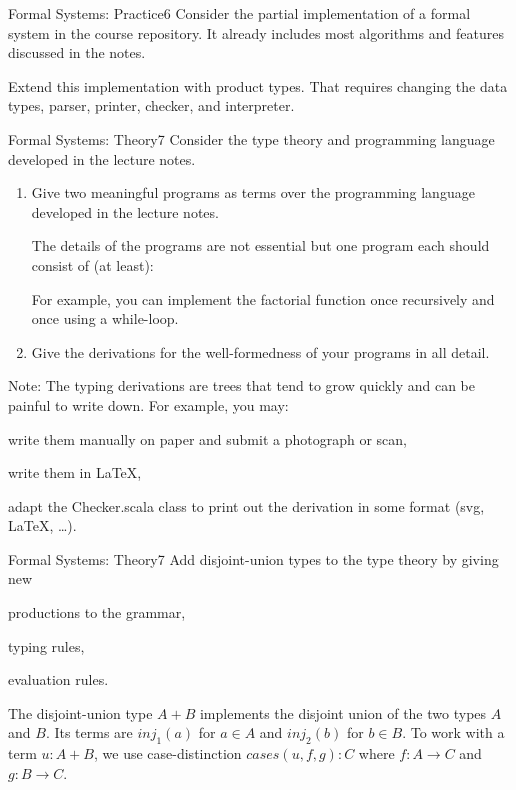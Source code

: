 \documentclass[a4paper]{article}
\begin{document}
\header

\begin{problem}{Formal Systems: Practice}{6}
Consider the partial implementation of a formal system in the course repository.
It already includes most algorithms and features discussed in the notes.

Extend this implementation with product types.
That requires changing the data types, parser, printer, checker, and interpreter.
\end{problem}

\begin{problem}{Formal Systems: Theory}{7}
Consider the type theory and programming language developed in the lecture notes.
\begin{enumerate}
\item Give two meaningful programs as terms over the programming language developed in the lecture notes.

The details of the programs are not essential but one program each should consist of (at least):
For example, you can implement the factorial function once recursively and once using a while-loop.

\item Give the derivations for the well-formedness of your programs in all detail.
\end{enumerate}

Note: The typing derivations are trees that tend to grow quickly and can be painful to write down.
For example, you may:
\begin{compactitem}
  \item write them manually on paper and submit a photograph or scan,
  \item write them in LaTeX,
  \item adapt the Checker.scala class to print out the derivation in some format (svg, LaTeX, \ldots).
\end{compactitem}
\end{problem}

\begin{problem}{Formal Systems: Theory}{7}
Add disjoint-union types to the type theory by giving new
\begin{compactitem}
 \item productions to the grammar,
 \item typing rules,
 \item evaluation rules.
\end{compactitem}

The disjoint-union type $A+B$ implements the disjoint union of the two types $A$ and $B$.
Its terms are $inj_1(a)$ for $a\in A$ and $inj_2(b)$ for $b\in B$.
To work with a term $u: A+B$, we use case-distinction $cases(u,f,g):C$ where $f:A\to C$ and $g:B\to C$.
\end{problem}
\end{document}

